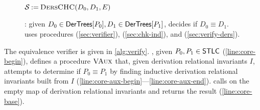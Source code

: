 \begin{figure}
\begin{minipage}{0.48\linewidth}
\begin{algorithm}[H]
  {  %
    { %
      $\mathcal{S} \mathbin{:=} \textsc{DersCHC}(D_0, D_1, E)$ %
      \label{line:vders-cons-chc} \;
    \label{line:vders-aux-end} } %
     \label{line:vders-base} \;
  } %
  \caption{%
    \verifyders: given $D_0 \in \mathsf{DerTrees}[ P_0 ], D_1 \in
    \mathsf{DerTrees}[ P_1 ]$, decides if $D_0 \equiv D_1$.
    \verify uses procedures \mergeinvs (\autoref{sec:verifier}), %
    \chkinductive (\autoref{sec:chk-ind}), and %
    \verifyders (\autoref{sec:verify-ders}).
  }
  \label{alg:verify-ders}
\end{algorithm}
  \end{minipage}
\end{figure}

The equivalence verifier \verify is given in \autoref{alg:verify}.
%
\verify, given $P_0, P_1 \in \mathsf{STLC}$ (\autoref{line:core-begin}),
defines a procedure $\textsc{VAux}$ that, given derivation relational
invariants $I$, attempts to determine if $P_0 \equiv P_1$ by finding
inductive derivation relational invariants built from $I$
(\autoref{line:core-aux-begin}---\autoref{line:core-aux-end}).
%
\verify calls \verifyaux on the empty map of derivation relational
invariants and returns the result (\autoref{line:core-base}).


